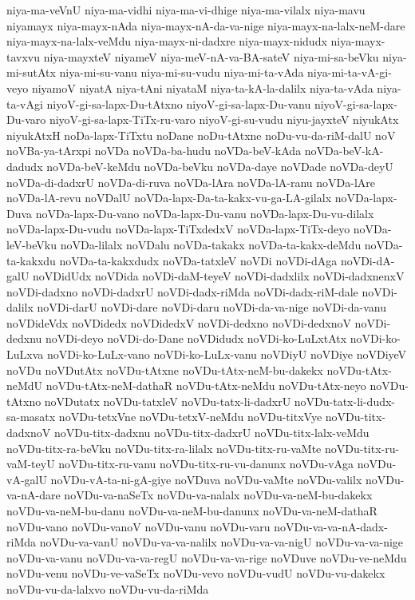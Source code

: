 {niya-ma-veVnU
niya-ma-vidhi
niya-ma-vi-dhige
niya-ma-vilalx
niya-mavu
niyamayx
niya-mayx-nAda
niya-mayx-nA-da-va-nige
niya-mayx-na-lalx-neM-dare
niya-mayx-na-lalx-veMdu
niya-mayx-ni-dadxre
niya-mayx-nidudx
niya-mayx-tavxvu
niya-mayxteV
niyameV
niya-meV-nA-va-BA-sateV
niya-mi-sa-beVku
niya-mi-sutAtx
niya-mi-su-vanu
niya-mi-su-vudu
niya-mi-ta-vAda
niya-mi-ta-vA-gi-veyo
niyamoV
niyatA
niya-tAni
niyataM
niya-ta-kA-la-dalilx
niya-ta-vAda
niya-ta-vAgi
niyoV-gi-sa-lapx-Du-tAtxno
niyoV-gi-sa-lapx-Du-vanu
niyoV-gi-sa-lapx-Du-varo
niyoV-gi-sa-lapx-TiTx-ru-varo
niyoV-gi-su-vudu
niyu-jayxteV
niyukAtx
niyukAtxH
noDa-lapx-TiTxtu
noDane
noDu-tAtxne
noDu-vu-da-riM-dalU
noV
noVBa-ya-tArxpi
noVDa
noVDa-ba-hudu
noVDa-beV-kAda
noVDa-beV-kA-dadudx
noVDa-beV-keMdu
noVDa-beVku
noVDa-daye
noVDade
noVDa-deyU
noVDa-di-dadxrU
noVDa-di-ruva
noVDa-lAra
noVDa-lA-ranu
noVDa-lAre
noVDa-lA-revu
noVDalU
noVDa-lapx-Da-ta-kakx-vu-ga-LA-gilalx
noVDa-lapx-Duva
noVDa-lapx-Du-vano
noVDa-lapx-Du-vanu
noVDa-lapx-Du-vu-dilalx
noVDa-lapx-Du-vudu
noVDa-lapx-TiTxdedxV
noVDa-lapx-TiTx-deyo
noVDa-leV-beVku
noVDa-lilalx
noVDalu
noVDa-takakx
noVDa-ta-kakx-deMdu
noVDa-ta-kakxdu
noVDa-ta-kakxdudx
noVDa-tatxleV
noVDi
noVDi-dAga
noVDi-dA-galU
noVDidUdx
noVDida
noVDi-daM-teyeV
noVDi-dadxlilx
noVDi-dadxnenxV
noVDi-dadxno
noVDi-dadxrU
noVDi-dadx-riMda
noVDi-dadx-riM-dale
noVDi-dalilx
noVDi-darU
noVDi-dare
noVDi-daru
noVDi-da-va-nige
noVDi-da-vanu
noVDideVdx
noVDidedx
noVDidedxV
noVDi-dedxno
noVDi-dedxnoV
noVDi-dedxnu
noVDi-deyo
noVDi-do-Dane
noVDidudx
noVDi-ko-LuLxtAtx
noVDi-ko-LuLxva
noVDi-ko-LuLx-vano
noVDi-ko-LuLx-vanu
noVDiyU
noVDiye
noVDiyeV
noVDu
noVDutAtx
noVDu-tAtxne
noVDu-tAtx-neM-bu-dakekx
noVDu-tAtx-neMdU
noVDu-tAtx-neM-dathaR
noVDu-tAtx-neMdu
noVDu-tAtx-neyo
noVDu-tAtxno
noVDutatx
noVDu-tatxleV
noVDu-tatx-li-dadxrU
noVDu-tatx-li-dudx-sa-masatx
noVDu-tetxVne
noVDu-tetxV-neMdu
noVDu-titxVye
noVDu-titx-dadxnoV
noVDu-titx-dadxnu
noVDu-titx-dadxrU
noVDu-titx-lalx-veMdu
noVDu-titx-ra-beVku
noVDu-titx-ra-lilalx
noVDu-titx-ru-vaMte
noVDu-titx-ru-vaM-teyU
noVDu-titx-ru-vanu
noVDu-titx-ru-vu-danunx
noVDu-vAga
noVDu-vA-galU
noVDu-vA-ta-ni-gA-giye
noVDuva
noVDu-vaMte
noVDu-valilx
noVDu-va-nA-dare
noVDu-va-naSeTx
noVDu-va-nalalx
noVDu-va-neM-bu-dakekx
noVDu-va-neM-bu-danu
noVDu-va-neM-bu-danunx
noVDu-va-neM-dathaR
noVDu-vano
noVDu-vanoV
noVDu-vanu
noVDu-varu
noVDu-va-va-nA-dadx-riMda
noVDu-va-vanU
noVDu-va-va-nalilx
noVDu-va-va-nigU
noVDu-va-va-nige
noVDu-va-vanu
noVDu-va-va-regU
noVDu-va-va-rige
noVDuve
noVDu-ve-neMdu
noVDu-venu
noVDu-ve-vaSeTx
noVDu-vevo
noVDu-vudU
noVDu-vu-dakekx
noVDu-vu-da-lalxvo
noVDu-vu-da-riMda
}
